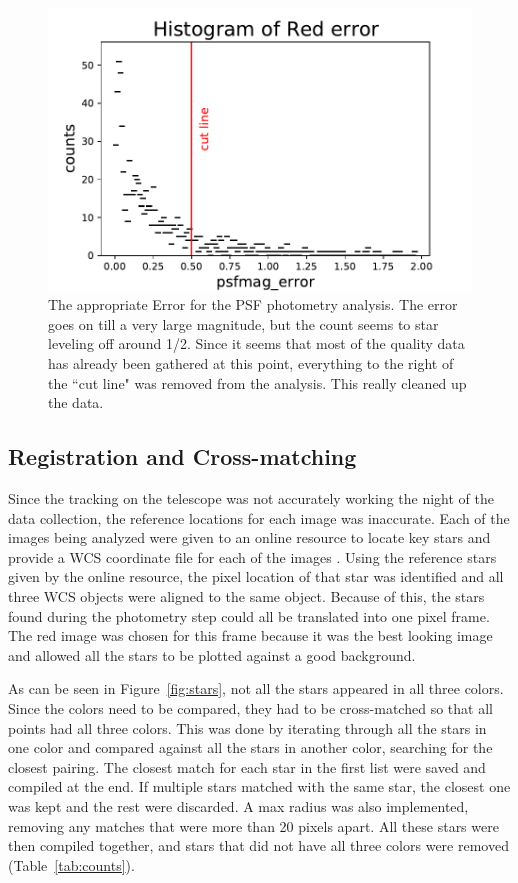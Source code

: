 \documentclass[twoside,11pt]{article}
\begin{document}
\begin{figure}[ht]
\centering
\includegraphics[scale=.75]{cutline.pdf}
\caption{The appropriate Error for the PSF photometry analysis. The error goes on till a very large magnitude, but the count seems to star leveling off around 1/2. Since it seems that most of the quality data has already been gathered at this point, everything to the right of the ``cut line" was removed from the analysis. This really cleaned up the data.}
\label{fig:cutline}
\end{figure}

\subsection{Registration and Cross-matching}
Since the tracking on the telescope was not accurately working the night of the data collection, the reference locations for each image was inaccurate. Each of the images being analyzed were given to an online resource to locate key stars and provide a WCS coordinate file for each of the images \citep{nova}. Using the reference stars given by the online resource, the pixel location of that star was identified and all three WCS objects were aligned to the same object. Because of this, the stars found during the photometry step could all be translated into one pixel frame. The red image was chosen for this frame because it was the best looking image and allowed all the stars to be plotted against a good background. 

As can be seen in Figure~\ref{fig:stars}, not all the stars appeared in all three colors. Since the colors need to be compared, they had to be cross-matched so that all points had all three colors. This was done by iterating through all the stars in one color and compared against all the stars in another color, searching for the closest pairing. The closest match for each star in the first list were saved and compiled at the end. If multiple stars matched with the same star, the closest one was kept and the rest were discarded. A max radius was also implemented, removing any matches that were more than 20 pixels apart. All these stars were then compiled together, and stars that did not have all three colors were removed (Table~\ref{tab:counts}). 
\end{document}
